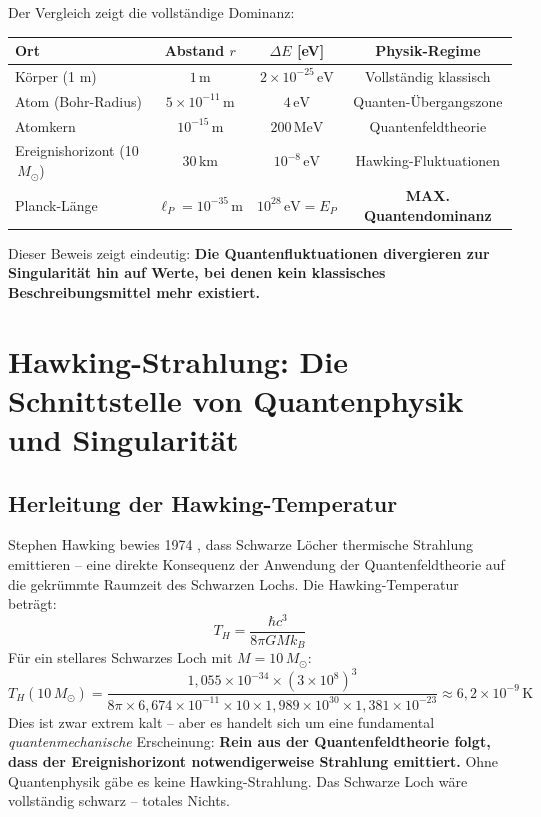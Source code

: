 ﻿\documentclass[12pt,a4paper]{report}
\begin{document}
Der Vergleich zeigt die vollständige Dominanz:

\begin{center}
\begin{tabular}{lccc}
    \hline
    \textbf{Ort} & \textbf{Abstand $r$} & \textbf{$\Delta E$ [eV]} & \textbf{Physik-Regime} \\
    \hline
    Körper (1 m) & $1\,\text{m}$ & $2 \times 10^{-25}\,\text{eV}$ & Vollständig klassisch \\
    Atom (Bohr-Radius) & $5 \times 10^{-11}\,\text{m}$ & $4\,\text{eV}$ & Quanten-Übergangszone \\
    Atomkern & $10^{-15}\,\text{m}$ & $200\,\text{MeV}$ & Quantenfeldtheorie \\
    Ereignishorizont (10$\,M_\odot$) & $30\,\text{km}$ & $10^{-8}\,\text{eV}$ & Hawking-Fluktuationen \\
    Planck-Länge & $\ell_P = 10^{-35}\,\text{m}$ & $10^{28}\,\text{eV} = E_P$ & \textbf{MAX. Quantendominanz} \\
    \hline
\end{tabular}
\end{center}

Dieser Beweis zeigt eindeutig: \textbf{Die Quantenfluktuationen divergieren zur Singularität hin auf Werte, bei denen kein klassisches Beschreibungsmittel mehr existiert.}


\section{Hawking-Strahlung: Die Schnittstelle von Quantenphysik und Singularität}

\subsection{Herleitung der Hawking-Temperatur}

Stephen Hawking bewies 1974 \cite{hawking1975}, dass Schwarze Löcher thermische Strahlung emittieren -- eine direkte Konsequenz der Anwendung der Quantenfeldtheorie auf die gekrümmte Raumzeit des Schwarzen Lochs. Die Hawking-Temperatur beträgt:
\begin{equation}
    T_H = \frac{\hbar c^3}{8\pi G M k_B}
    \label{eq:hawking_temperatur}
\end{equation}
Für ein stellares Schwarzes Loch mit $M = 10\,M_\odot$:
\begin{equation}
    T_H(10\,M_\odot) = \frac{1{,}055 \times 10^{-34} \times (3 \times 10^8)^3}{8\pi \times 6{,}674 \times 10^{-11} \times 10 \times 1{,}989 \times 10^{30} \times 1{,}381 \times 10^{-23}} \approx 6{,}2 \times 10^{-9}\,\text{K}
    \label{eq:hawking_zahlenwert}
\end{equation}
Dies ist zwar extrem kalt -- aber es handelt sich um eine fundamental \emph{quantenmechanische} Erscheinung: \textbf{Rein aus der Quantenfeldtheorie folgt, dass der Ereignishorizont notwendigerweise Strahlung emittiert.} Ohne Quantenphysik gäbe es keine Hawking-Strahlung. Das Schwarze Loch wäre vollständig schwarz -- totales Nichts.
\end{document}
